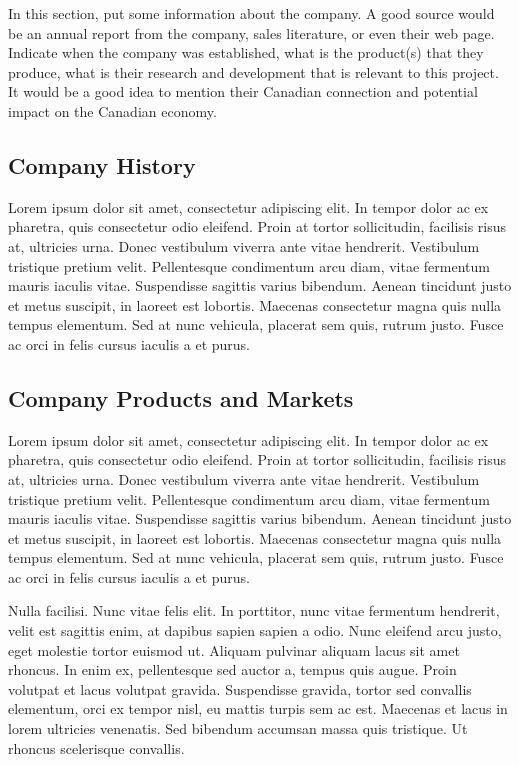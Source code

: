 \documentclass[12pt]{article}
\begin{document}
\setcounter{page}{12}

In this section, put some information about the company. A good source would be an annual report from the company, sales literature, or even their web page. Indicate when the company was established, what is the product(s) that they produce, what is their research and development that is relevant to this project. It would be a good idea to mention their Canadian connection and potential impact on the Canadian economy. 

\subsection*{Company History}

Lorem ipsum dolor sit amet, consectetur adipiscing elit. In tempor dolor ac ex pharetra, quis consectetur odio eleifend. Proin at tortor sollicitudin, facilisis risus at, ultricies urna. Donec vestibulum viverra ante vitae hendrerit. Vestibulum tristique pretium velit. Pellentesque condimentum arcu diam, vitae fermentum mauris iaculis vitae. Suspendisse sagittis varius bibendum. Aenean tincidunt justo et metus suscipit, in laoreet est lobortis. Maecenas consectetur magna quis nulla tempus elementum. Sed at nunc vehicula, placerat sem quis, rutrum justo. Fusce ac orci in felis cursus iaculis a et purus.


\subsection*{Company Products and Markets}

 Lorem ipsum dolor sit amet, consectetur adipiscing elit. In tempor dolor ac ex pharetra, quis consectetur odio eleifend. Proin at tortor sollicitudin, facilisis risus at, ultricies urna. Donec vestibulum viverra ante vitae hendrerit. Vestibulum tristique pretium velit. Pellentesque condimentum arcu diam, vitae fermentum mauris iaculis vitae. Suspendisse sagittis varius bibendum. Aenean tincidunt justo et metus suscipit, in laoreet est lobortis. Maecenas consectetur magna quis nulla tempus elementum. Sed at nunc vehicula, placerat sem quis, rutrum justo. Fusce ac orci in felis cursus iaculis a et purus.

Nulla facilisi. Nunc vitae felis elit. In porttitor, nunc vitae fermentum hendrerit, velit est sagittis enim, at dapibus sapien sapien a odio. Nunc eleifend arcu justo, eget molestie tortor euismod ut. Aliquam pulvinar aliquam lacus sit amet rhoncus. In enim ex, pellentesque sed auctor a, tempus quis augue. Proin volutpat et lacus volutpat gravida. Suspendisse gravida, tortor sed convallis elementum, orci ex tempor nisl, eu mattis turpis sem ac est. Maecenas et lacus in lorem ultricies venenatis. Sed bibendum accumsan massa quis tristique. Ut rhoncus scelerisque convallis. 
\end{document}
